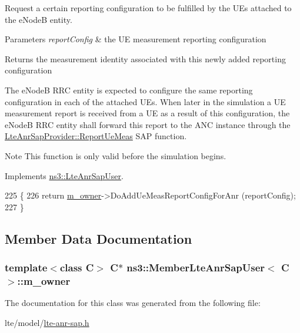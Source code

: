 Request a certain reporting configuration to be fulfilled by the U\+Es attached to the e\+NodeB entity. 


\begin{DoxyParams}{Parameters}
{\em report\+Config} & the UE measurement reporting configuration \\
\hline
\end{DoxyParams}
\begin{DoxyReturn}{Returns}
the measurement identity associated with this newly added reporting configuration
\end{DoxyReturn}
The e\+NodeB R\+RC entity is expected to configure the same reporting configuration in each of the attached U\+Es. When later in the simulation a UE measurement report is received from a UE as a result of this configuration, the e\+NodeB R\+RC entity shall forward this report to the A\+NC instance through the \hyperlink{classns3_1_1LteAnrSapProvider_ac4f1114bd33d0c189e2ce2624089e587}{Lte\+Anr\+Sap\+Provider\+::\+Report\+Ue\+Meas} S\+AP function.

\begin{DoxyNote}{Note}
This function is only valid before the simulation begins. 
\end{DoxyNote}


Implements \hyperlink{classns3_1_1LteAnrSapUser_ac65225b3a8f1e011cc0ed2c99df4d139}{ns3\+::\+Lte\+Anr\+Sap\+User}.


\begin{DoxyCode}
225 \{
226   \textcolor{keywordflow}{return} \hyperlink{classns3_1_1MemberLteAnrSapUser_ab3e457bf7a5fc91f5452571dc545c5f2}{m\_owner}->DoAddUeMeasReportConfigForAnr (reportConfig);
227 \}
\end{DoxyCode}


\subsection{Member Data Documentation}
\subsubsection[{\texorpdfstring{m\+\_\+owner}{m_owner}}]{\setlength{\rightskip}{0pt plus 5cm}template$<$class C$>$ {\bf C}$\ast$ {\bf ns3\+::\+Member\+Lte\+Anr\+Sap\+User}$<$ {\bf C} $>$\+::m\+\_\+owner\hspace{0.3cm}{\ttfamily [private]}}\hypertarget{classns3_1_1MemberLteAnrSapUser_ab3e457bf7a5fc91f5452571dc545c5f2}{}\label{classns3_1_1MemberLteAnrSapUser_ab3e457bf7a5fc91f5452571dc545c5f2}


The documentation for this class was generated from the following file\+:\begin{DoxyCompactItemize}
\item 
lte/model/\hyperlink{lte-anr-sap_8h}{lte-\/anr-\/sap.\+h}\end{DoxyCompactItemize}
